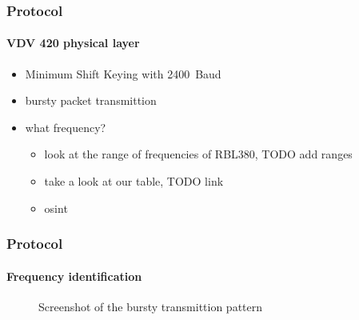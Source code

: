 
\begin{frame}
\frametitle{Protocol}
\framesubtitle{VDV 420 physical layer}
\begin{itemize}
	\item Minimum Shift Keying with \SI{2400}{Baud}
	\item bursty packet transmittion
		\item what frequency?
		\begin{itemize}
			\item look at the range of frequencies of RBL380, TODO add ranges
			\item take a look at our table, TODO link
			\item osint
		\end{itemize}
\end{itemize}
\end{frame}


\begin{frame}
\frametitle{Protocol}
\framesubtitle{Frequency identification}
\begin{figure}
\centering
\missingfigure[figwidth=7cm]{}
\caption{Screenshot of the bursty transmittion pattern}
\end{figure}
\end{frame}


